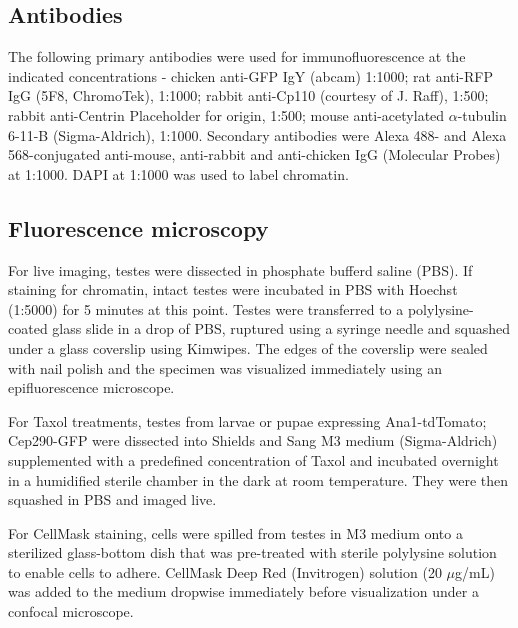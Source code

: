 \documentclass[12pt, twoside, letterpaper]{article}
\begin{document}
\begin{doublespacing}
\begin{linenumbers}
    \subsection{Antibodies}
    The following primary antibodies were used for immunofluorescence
    at the indicated concentrations -
    chicken anti-GFP IgY (abcam) 1:1000;
    rat anti-RFP IgG (5F8, ChromoTek), 1:1000;
    rabbit anti-Cp110 (courtesy of J. Raff), 1:500;
    rabbit anti-Centrin {Placeholder for origin}, 1:500;
    mouse anti-acetylated $\alpha$-tubulin 6-11-B (Sigma-Aldrich), 1:1000.
    Secondary antibodies were Alexa 488- and Alexa 568-conjugated
    anti-mouse, anti-rabbit and anti-chicken
    IgG (Molecular Probes) at 1:1000.
    DAPI at 1:1000 was used to label chromatin.

    \subsection{Fluorescence microscopy}
    For live imaging, testes were dissected in phosphate bufferd saline (PBS).
    If staining for chromatin, intact testes were incubated in PBS with
    Hoechst (1:5000) for 5 minutes at this point.
    Testes were transferred to a polylysine-coated glass slide in a drop of PBS,
    ruptured using a syringe needle and
    squashed under a glass coverslip using Kimwipes.
    The edges of the coverslip were sealed with nail polish
    and the specimen was visualized immediately using an epifluorescence microscope.

    For Taxol treatments, testes from larvae or pupae expressing
    Ana1-tdTomato; Cep290-GFP were
    dissected into Shields and Sang M3 medium (Sigma-Aldrich) supplemented
    with a predefined
    concentration of Taxol and incubated overnight in a humidified sterile
    chamber in the dark at room temperature. They were then squashed
    in PBS and imaged live.

    For CellMask staining, cells were spilled from testes in M3 medium onto
    a sterilized glass-bottom dish that was pre-treated with sterile polylysine solution
    to enable cells to adhere.
    CellMask Deep Red (Invitrogen) solution (20 $\mu$g/mL) was added to the medium dropwise
    immediately before visualization under a confocal microscope.


\end{linenumbers}
\end{doublespacing}
\end{document}
